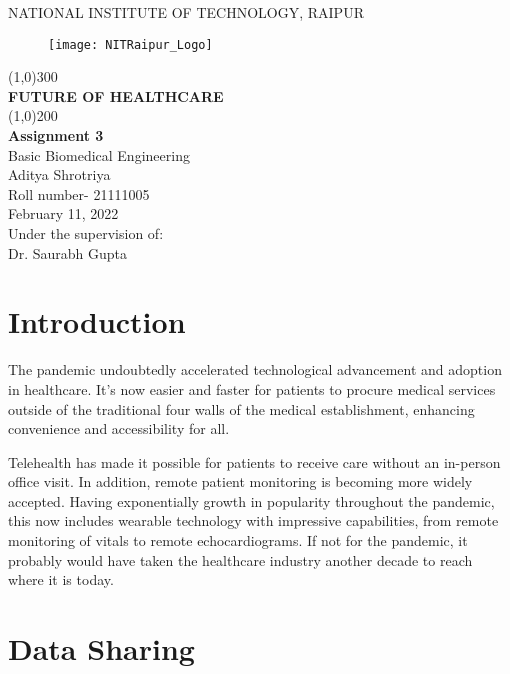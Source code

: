 \documentclass[12pt]{article}
\begin{document}
\begin{titlepage}
\begin{center}

\large{NATIONAL INSTITUTE OF TECHNOLOGY, RAIPUR}\\
[1.5mm]
\begin{figure}[h]
\centering
\texttt{[image: NITRaipur\_Logo]}
\end{figure}
\line(1,0){300}\\
[0.25in]
\huge{\bfseries FUTURE OF HEALTHCARE}\\
[2mm]
\line(1,0){200}\\
[0.25in]
\large{\bfseries Assignment 3}\\
{Basic Biomedical Engineering}\\
[0.75cm]
\large{Aditya Shrotriya}\\
{Roll number- 21111005}\\
{February 11, 2022}\\
[1cm]
\large{Under the supervision of:}\\
{Dr. Saurabh Gupta}

\end{center}
\end{titlepage}
\clearpage
\tableofcontents
\clearpage 

\section{Introduction}

The pandemic undoubtedly accelerated technological advancement and adoption in healthcare. It's now easier and faster for patients to procure medical services outside of the traditional four walls of the medical establishment, enhancing convenience and accessibility for all.

Telehealth has made it possible for patients to receive care without an in-person office visit. In addition, remote patient monitoring is becoming more widely accepted. Having exponentially growth in  popularity throughout the pandemic, this now includes wearable technology with impressive capabilities, from remote monitoring of vitals to remote echocardiograms. If not for the pandemic, it probably would have taken the healthcare industry another decade to reach where it is today.

\section{Data Sharing}
\end{document}
